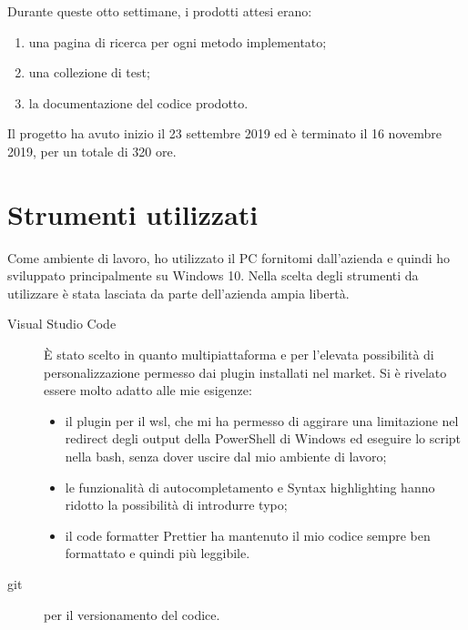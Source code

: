 Durante queste otto settimane, i prodotti attesi erano:
\begin{enumerate}
    \item una pagina di ricerca per ogni metodo implementato; 
    \item una collezione di test;
    \item la documentazione del codice prodotto.
\end{enumerate}

Il progetto ha avuto inizio il 23 settembre 2019 ed è terminato il 16 novembre 2019, per
un totale di 320 ore.


%
%
%


\section{Strumenti utilizzati}
Come ambiente di lavoro, ho utilizzato il PC fornitomi dall'azienda e
quindi ho sviluppato principalmente su Windows 10.
Nella scelta degli strumenti da utilizzare è stata lasciata da parte dell'azienda
ampia libertà.

\begin{description}
    \item[Visual Studio Code] È stato scelto in quanto multipiattaforma e per 
    l'elevata possibilità di personalizzazione permesso dai plugin installati 
    nel market. Si è rivelato essere molto adatto alle mie esigenze:
    \begin{itemize}
        \item il plugin per il \gls{wsl}, che mi ha permesso di aggirare una limitazione nel redirect degli output della PowerShell di Windows ed eseguire lo script nella bash, senza dover uscire dal mio ambiente di lavoro; 
        \item le funzionalità di autocompletamento e Syntax highlighting hanno ridotto la possibilità di introdurre typo;
        \item il code formatter Prettier ha mantenuto il mio codice sempre ben formattato e quindi più leggibile.
    \end{itemize}
    
    \item[\gls{git}\glsfirstoccur{}] per il versionamento del codice.
\end{description}

